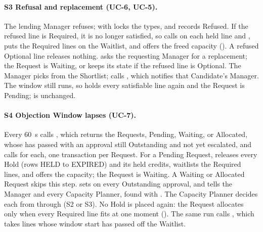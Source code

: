 \paragraph{S3 Refusal and replacement (UC-6, UC-5).} The lending Manager refuses;  with  locks the types, and  records Refused. If the refused line is Required, it is no longer satisfied, so  calls  on each held line and , puts the Required lines on the Waitlist, and offers the freed capacity (). A refused Optional line releases nothing.  asks the requesting Manager for a replacement; the Request is Waiting, or keeps its state if the refused line is Optional. The Manager picks from the Shortlist;  calls , which notifies that Candidate's Manager. The window still runs, so  holds every satisfiable line again and the Request is Pending;  is unchanged.

\paragraph{S4 Objection Window lapses (UC-7).} Every 60~s  calls , which returns the Requests, Pending, Waiting, or Allocated, whose  has passed with an approval still Outstanding and not yet escalated, and calls  for each, one transaction per Request. For a Pending Request,  releases every Hold (rows HELD to EXPIRED) and its held credits, waitlists the Required lines, and offers the capacity; the Request is Waiting. A Waiting or Allocated Request skips this step.  sets  on every Outstanding approval, and  tells the Manager and every Capacity Planner, found with . The Capacity Planner decides each from  through  (S2 or S3). No Hold is placed again: the Request allocates only when every Required line fits at one moment (). The same run calls , which takes lines whose window start has passed off the Waitlist.

